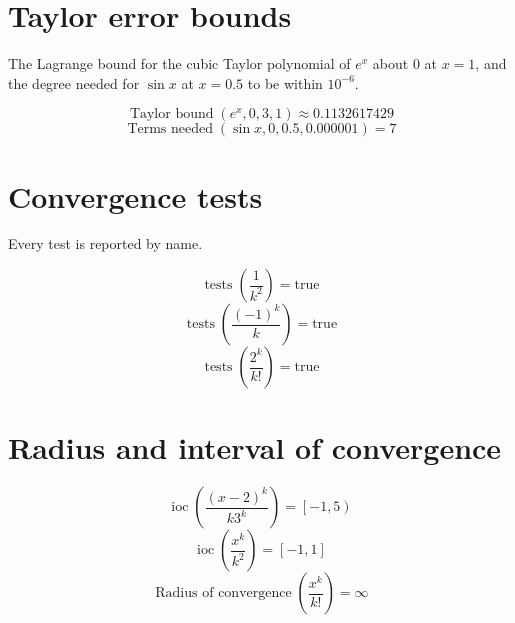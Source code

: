 \documentclass[11pt,a4paper]{article}
\theoremstyle{plain}
\theoremstyle{definition}
\theoremstyle{remark}
\begin{document}
\section*{Taylor error bounds}

The Lagrange bound for the cubic Taylor polynomial of $e^x$ about $0$ at $x = 1$, and the degree needed for $\sin x$ at $x = 0.5$ to be within $10^{-6}$.

\begin{equation*}
  \operatorname{Taylor\ bound}(e^x, 0, 3, 1) \approx 0.1132617429
\end{equation*}
\begin{equation*}
  \operatorname{Terms\ needed}(\sin x, 0, 0.5, 0.000001) = 7
\end{equation*}
\section*{Convergence tests}

Every test is reported by name.

\begin{equation*}
  \operatorname{tests}(\frac{1}{k^2}) = \text{true}
\end{equation*}
\begin{equation*}
  \operatorname{tests}(\frac{(-1)^k}{k}) = \text{true}
\end{equation*}
\begin{equation*}
  \operatorname{tests}(\frac{2^k}{k!}) = \text{true}
\end{equation*}
\section*{Radius and interval of convergence}

\begin{equation*}
  \operatorname{ioc}(\frac{(x-2)^k}{k 3^k}) = \left[-1, 5\right)
\end{equation*}
\begin{equation*}
  \operatorname{ioc}(\frac{x^k}{k^2}) = \left[-1, 1\right]
\end{equation*}
\begin{equation*}
  \operatorname{Radius\ of\ convergence}(\frac{x^k}{k!}) = \infty
\end{equation*}
\end{document}

